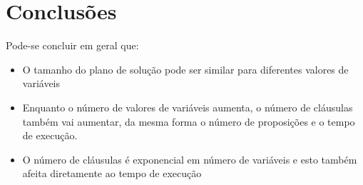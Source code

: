\section{Conclusões}
	Pode-se concluir em geral que:\\
	\begin{itemize}
		\item O tamanho do plano de solução pode ser similar para diferentes valores de variáveis
		\item Enquanto o número de valores de variáveis aumenta, o número de cláusulas também vai aumentar, da mesma forma o número de proposições e o tempo de execução.
		\item O número de cláusulas é exponencial em número de variáveis e esto também afeita diretamente ao tempo de execução
	\end{itemize}
\clearpage
